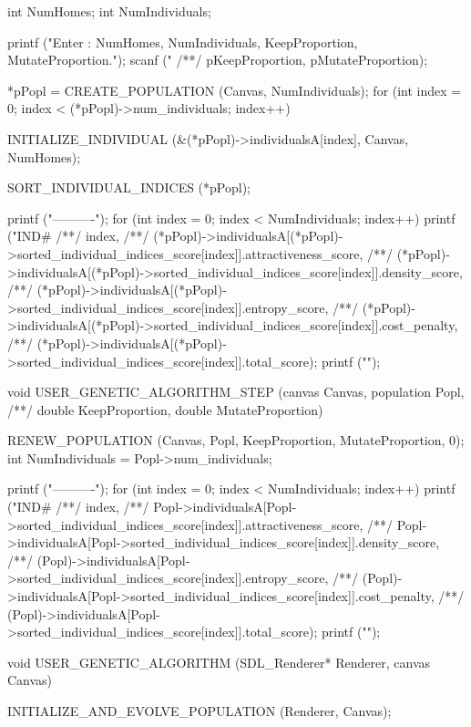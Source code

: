 \begin{C}
{	int NumHomes;
	int NumIndividuals;
	
	printf ("Enter : NumHomes, NumIndividuals, KeepProportion, MutateProportion.\n");
	scanf ("%
	/**/ pKeepProportion, pMutateProportion);
	
	*pPopl = CREATE_POPULATION (Canvas, NumIndividuals);
	for (int index = 0; index < (*pPopl)->num_individuals; index++){
		
		INITIALIZE_INDIVIDUAL (&(*pPopl)->individualsA[index], Canvas, NumHomes);
	}
	SORT_INDIVIDUAL_INDICES (*pPopl);
	
	printf ("\n----------\n");
	for (int index = 0; index < NumIndividuals; index++){
		printf ("IND#%
		/**/ index,
		/**/ (*pPopl)->individualsA[(*pPopl)->sorted_individual_indices_score[index]].attractiveness_score,
		/**/ (*pPopl)->individualsA[(*pPopl)->sorted_individual_indices_score[index]].density_score,
		/**/ (*pPopl)->individualsA[(*pPopl)->sorted_individual_indices_score[index]].entropy_score,
		/**/ (*pPopl)->individualsA[(*pPopl)->sorted_individual_indices_score[index]].cost_penalty,
		/**/ (*pPopl)->individualsA[(*pPopl)->sorted_individual_indices_score[index]].total_score);
	}
	printf ("\n");
}

void USER_GENETIC_ALGORITHM_STEP (canvas Canvas, population Popl,
/**/ double KeepProportion, double MutateProportion){
	
	RENEW_POPULATION (Canvas, Popl, KeepProportion, MutateProportion, 0);
	int NumIndividuals = Popl->num_individuals;
	
	printf ("\n----------\n");
	for (int index = 0; index < NumIndividuals; index++){
		printf ("IND#%
		/**/ index,
		/**/ Popl->individualsA[Popl->sorted_individual_indices_score[index]].attractiveness_score,
		/**/ Popl->individualsA[Popl->sorted_individual_indices_score[index]].density_score,
		/**/ (Popl)->individualsA[Popl->sorted_individual_indices_score[index]].entropy_score,
		/**/ (Popl)->individualsA[Popl->sorted_individual_indices_score[index]].cost_penalty,
		/**/ (Popl)->individualsA[Popl->sorted_individual_indices_score[index]].total_score);
	}
	printf ("\n");
}


void USER_GENETIC_ALGORITHM (SDL_Renderer* Renderer, canvas Canvas){
	
	INITIALIZE_AND_EVOLVE_POPULATION (Renderer, Canvas);
}
\end{C}
